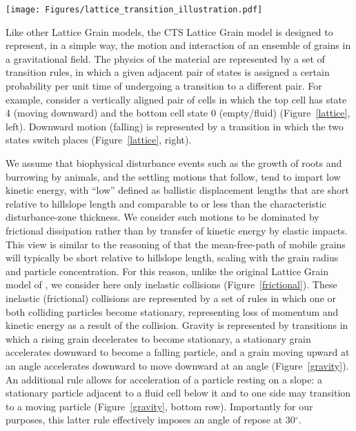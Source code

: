 \documentclass[esurf, manuscript]{copernicus}
\begin{document}
\begin{figure*}[t]
\texttt{[image: Figures/lattice\_transition\_illustration.pdf]}
\caption{Example of a four-by-four lattice, illustrating the first nine states in the Grain Hill model and including an example transition in which a falling grain trades places with the fluid cell below it.}
\label{lattice}
\end{figure*}

Like other Lattice Grain models, the CTS Lattice Grain model is designed to represent, in a simple way, the motion and interaction of an ensemble of grains in a gravitational field. The physics of the material are represented by a set of transition rules, in which a given adjacent pair of states is assigned a certain probability per unit time of undergoing a transition to a different pair. For example, consider a vertically aligned pair of cells in which the top cell has state 4 (moving downward) and the bottom cell state 0 (empty/fluid) (Figure~\ref{lattice}, left). Downward motion (falling) is represented by a transition in which the two states switch places (Figure~\ref{lattice}, right).

We assume that biophysical disturbance events such as the growth of roots and burrowing by animals, and the settling motions that follow, tend to impart low kinetic energy, with ``low'' defined as ballistic displacement lengths that are short relative to hillslope length and comparable to or less than the characteristic disturbance-zone thickness. We consider such motions to be dominated by frictional dissipation rather than by transfer of kinetic energy by elastic impacts. This view is similar to the reasoning of \citet{furbish2009statistical} that the mean-free-path of mobile grains will typically be short relative to hillslope length, scaling with the grain radius and particle concentration. For this reason, unlike the original Lattice Grain model of \citet{tucker2016celllab}, we consider here only inelastic collisions (Figure~\ref{frictional}). These inelastic (frictional) collisions are represented by a set of rules in which one or both colliding particles become stationary, representing loss of momentum and kinetic energy as a result of the collision. Gravity is represented by transitions in which a rising grain decelerates to become stationary, a stationary grain accelerates downward to become a falling particle, and a grain moving upward at an angle accelerates downward to move downward at an angle (Figure~\ref{gravity}). An additional rule allows for acceleration of a particle resting on a slope: a stationary particle adjacent to a fluid cell below it and to one side may transition to a moving particle %
(Figure~\ref{gravity}, bottom row). Importantly for our purposes, this latter rule effectively imposes an angle of repose at 30$^\circ$.
\end{document}
